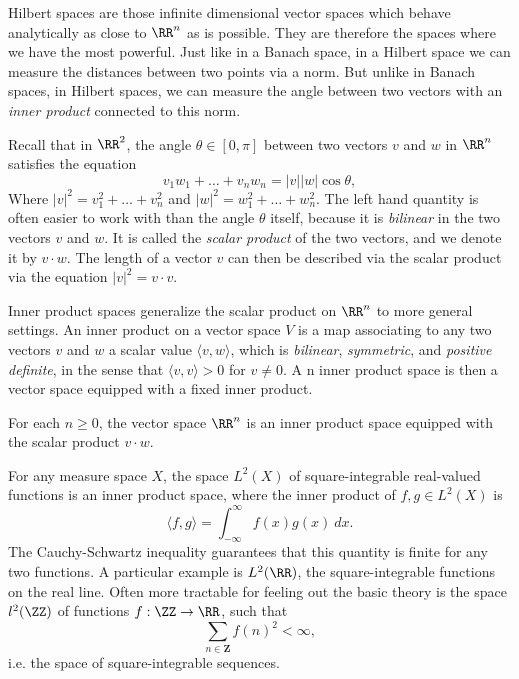 Hilbert spaces are those infinite dimensional vector spaces which behave analytically as close to $\RR^n$ as is possible. They are therefore the spaces where we have the most powerful. Just like in a Banach space, in a Hilbert space we can measure the distances between two points via a norm. But unlike in Banach spaces, in Hilbert spaces, we can measure the angle between two vectors with an \emph{inner product} connected to this norm.

Recall that in $\RR^2$, the angle $\theta \in [0,\pi]$ between two vectors $v$ and $w$ in $\RR^n$ satisfies the equation
%
\[ v_1w_1 + \dots + v_n w_n = |v||w| \cos \theta, \]
%
Where $|v|^2 = v_1^2 + \dots + v_n^2$ and $|w|^2 = w_1^2 + \dots + w_n^2$. The left hand quantity is often easier to work with than the angle $\theta$ itself, because it is \emph{bilinear} in the two vectors $v$ and $w$. It is called the \emph{scalar product} of the two vectors, and we denote it by $v \cdot w$. The length of a vector $v$ can then be described via the scalar product via the equation $|v|^2 = v \cdot v$.

Inner product spaces generalize the scalar product on $\RR^n$ to more general settings. An inner product on a vector space $V$ is a map associating to any two vectors $v$ and $w$ a scalar value $\langle v, w \rangle$, which is \emph{bilinear}, \emph{symmetric}, and \emph{positive definite}, in the sense that $\langle v, v \rangle > 0$ for $v \neq 0$. A n inner product space is then a vector space equipped with a fixed inner product.

\begin{example}
    For each $n \geq 0$, the vector space $\RR^n$ is an inner product space equipped with the scalar product $v \cdot w$.
\end{example}

\begin{example}
    For any measure space $X$, the space $L^2(X)$ of square-integrable real-valued functions is an inner product space, where the inner product of $f,g \in L^2(X)$ is
    \[ \langle f, g \rangle = \int_{-\infty}^\infty f(x) g(x)\ dx. \]
    The Cauchy-Schwartz inequality guarantees that this quantity is finite for any two functions. A particular example is $L^2(\RR)$, the square-integrable functions on the real line. Often more tractable for feeling out the basic theory is the space $l^2(\ZZ)$ of functions $f: \ZZ \to \RR$, such that
    \[ \sum_{n \in \mathbf{Z}} f(n)^2 < \infty, \]
    i.e. the space of square-integrable sequences.
\end{example}

